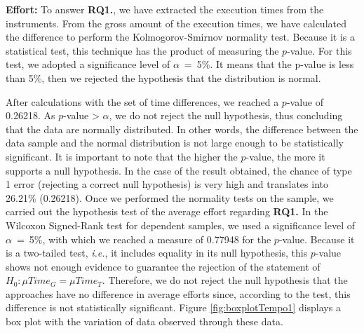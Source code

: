 \textbf{Effort:} 
To answer \textbf{RQ1.},  
we have extracted the execution times from the instruments.
From the gross amount of the execution times, we have calculated the difference to perform the Kolmogorov-Smirnov normality test.
Because it is a statistical test, this technique has the product of measuring the $p$-value.
For this test, we adopted a significance level of $\alpha$~=~5\%.
It means that the p-value is less than 5\%, then we rejected the hypothesis that the distribution is normal.

After calculations with the set of time differences, we reached a $p$-value of 0.26218.
As $p$-value > $\alpha$, we do not reject the null hypothesis, thus concluding that the data are normally distributed.
In other words, the difference between the data sample and the normal distribution is not large enough to be statistically significant.
It is important to note that the higher the $p$-value, the more it supports a null hypothesis.
In the case of the result obtained, the chance of type 1 error (rejecting a correct null hypothesis) is very high and translates into 26.21\% (0.26218).
Once we performed the normality tests on the sample, we carried out the hypothesis test of the average effort regarding \textbf{RQ1.}
In the Wilcoxon Signed-Rank test for dependent samples, we used a significance level of $\alpha$~=~5\%, with which we reached a measure of 0.77948 for the $p$-value.
Because it is a two-tailed test, \textit{i.e.}, it includes equality in its null hypothesis, this $p$-value shows not enough evidence to guarantee the rejection of the statement of $H_0: \mu Time_G = \mu Time_T$.
Therefore, we do not reject the null hypothesis that the approaches have no difference in average efforts since, according to the test, this difference is not statistically significant. 
Figure \ref{fig:boxplotTempo1} displays a box plot with the variation of data observed through these data.

%     

